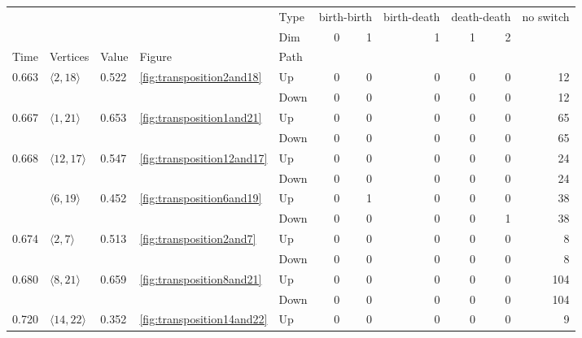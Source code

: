 \documentclass{article}
\begin{document}
\begin{center}
\begin{tabular}{lllllrrrrrr}
\toprule
 &  &  &  & Type & \multicolumn{2}{r}{birth-birth} & birth-death & \multicolumn{2}{r}{death-death} & no switch \\
 &  &  &  & Dim & 0 & 1 & 1 & 1 & 2 &  \\
Time & Vertices & Value & Figure & Path &  &  &  &  &  &  \\
\midrule
\multirow[t]{2}{*}{0.663} & \multirow[t]{2}{*}{$\langle2, 18\rangle$} & \multirow[t]{2}{*}{0.522} & \multirow[t]{2}{*}{\ref{fig:transposition2and18}} & Up & 0 & 0 & 0 & 0 & 0 & 12 \\
 &  &  &  & Down & 0 & 0 & 0 & 0 & 0 & 12 \\
\cline{1-11} \cline{2-11} \cline{3-11} \cline{4-11}
\multirow[t]{2}{*}{0.667} & \multirow[t]{2}{*}{$\langle1, 21\rangle$} & \multirow[t]{2}{*}{0.653} & \multirow[t]{2}{*}{\ref{fig:transposition1and21}} & Up & 0 & 0 & 0 & 0 & 0 & 65 \\
 &  &  &  & Down & 0 & 0 & 0 & 0 & 0 & 65 \\
\cline{1-11} \cline{2-11} \cline{3-11} \cline{4-11}
\multirow[t]{4}{*}{0.668} & \multirow[t]{2}{*}{$\langle12, 17\rangle$} & \multirow[t]{2}{*}{0.547} & \multirow[t]{2}{*}{\ref{fig:transposition12and17}} & Up & 0 & 0 & 0 & 0 & 0 & 24 \\
 &  &  &  & Down & 0 & 0 & 0 & 0 & 0 & 24 \\
\cline{2-11} \cline{3-11} \cline{4-11}
 & \multirow[t]{2}{*}{$\langle6, 19\rangle$} & \multirow[t]{2}{*}{0.452} & \multirow[t]{2}{*}{\ref{fig:transposition6and19}} & Up & 0 & 1 & 0 & 0 & 0 & 38 \\
 &  &  &  & Down & 0 & 0 & 0 & 0 & 1 & 38 \\
\cline{1-11} \cline{2-11} \cline{3-11} \cline{4-11}
\multirow[t]{2}{*}{0.674} & \multirow[t]{2}{*}{$\langle2, 7\rangle$} & \multirow[t]{2}{*}{0.513} & \multirow[t]{2}{*}{\ref{fig:transposition2and7}} & Up & 0 & 0 & 0 & 0 & 0 & 8 \\
 &  &  &  & Down & 0 & 0 & 0 & 0 & 0 & 8 \\
\cline{1-11} \cline{2-11} \cline{3-11} \cline{4-11}
\multirow[t]{2}{*}{0.680} & \multirow[t]{2}{*}{$\langle8, 21\rangle$} & \multirow[t]{2}{*}{0.659} & \multirow[t]{2}{*}{\ref{fig:transposition8and21}} & Up & 0 & 0 & 0 & 0 & 0 & 104 \\
 &  &  &  & Down & 0 & 0 & 0 & 0 & 0 & 104 \\
\cline{1-11} \cline{2-11} \cline{3-11} \cline{4-11}
\multirow[t]{2}{*}{0.720} & \multirow[t]{2}{*}{$\langle14, 22\rangle$} & \multirow[t]{2}{*}{0.352} & \multirow[t]{2}{*}{\ref{fig:transposition14and22}} & Up & 0 & 0 & 0 & 0 & 0 & 9 \\

\end{tabular}
\end{center}
\end{document}
